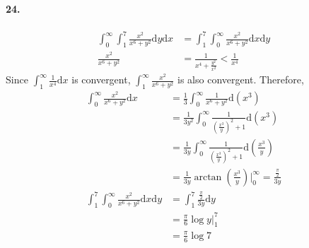 \documentclass[11pt, a4paper]{article}
\begin{document}
\paragraph{24.}
$$\begin{aligned}
    \int_{0}^{\infty}\int_{1}^{7}\frac{x^2}{x^6 + y^2}\mathrm{d}y\mathrm{d}x &= \int_{1}^{7}\int_{0}^{\infty}\frac{x^2}{x^6 + y^2}\mathrm{d}x\mathrm{d}y \\
    \frac{x^2}{x^6 + y^2} &= \frac{1}{x^4 + \frac{y^2}{x^2}} < \frac{1}{x^4}
\end{aligned}$$
Since $\int_{1}^{\infty}\frac{1}{x^4}\mathrm{d}x$ is convergent, $\int_{1}^{\infty}\frac{x^2}{x^6 + y^2}$ is also convergent. Therefore,
$$\begin{aligned}
    \int_{0}^{\infty}\frac{x^2}{x^6 + y^2}\mathrm{d}x &= \frac{1}{3}\int_{0}^{\infty}\frac{1}{x^6 + y^2}\mathrm{d}(x^3) \\
    &= \frac{1}{3y^2}\int_{0}^{\infty}\frac{1}{(\frac{x^3}{y})^2 + 1}\mathrm{d}(x^3) \\
    &= \frac{1}{3y}\int_{0}^{\infty}\frac{1}{(\frac{x^3}{y})^2 + 1}\mathrm{d}(\frac{x^3}{y}) \\
    &= \frac{1}{3y}\arctan(\frac{x^3}{y})\Big|_{0}^{\infty} = \frac{\frac{\pi}{2}}{3y} \\
    \int_{1}^{7}\int_{0}^{\infty}\frac{x^2}{x^6 + y^2}\mathrm{d}x\mathrm{d}y &= \int_{1}^{7} \frac{\frac{\pi}{2}}{3y} \mathrm{d}y \\
    &= \frac{\pi}{6}\log y\Big|_{1}^{7} \\
    &= \frac{\pi}{6}\log 7
\end{aligned}$$
\end{document}
